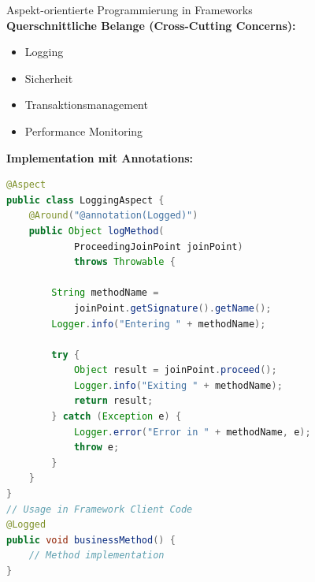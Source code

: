 \begin{concept}{Aspekt-orientierte Programmierung in Frameworks}\\
\textbf{Querschnittliche Belange (Cross-Cutting Concerns):}
\begin{itemize}
    \item Logging
    \item Sicherheit
    \item Transaktionsmanagement
    \item Performance Monitoring
\end{itemize}

\textbf{Implementation mit Annotations:}
\begin{lstlisting}[language=Java, style=basesmol]
@Aspect
public class LoggingAspect {
    @Around("@annotation(Logged)")
    public Object logMethod(
            ProceedingJoinPoint joinPoint) 
            throws Throwable {
        
        String methodName = 
            joinPoint.getSignature().getName();
        Logger.info("Entering " + methodName);
        
        try {
            Object result = joinPoint.proceed();
            Logger.info("Exiting " + methodName);
            return result;
        } catch (Exception e) {
            Logger.error("Error in " + methodName, e);
            throw e;
        }
    }
}
// Usage in Framework Client Code
@Logged
public void businessMethod() {
    // Method implementation
}
\end{lstlisting}
\end{concept}



